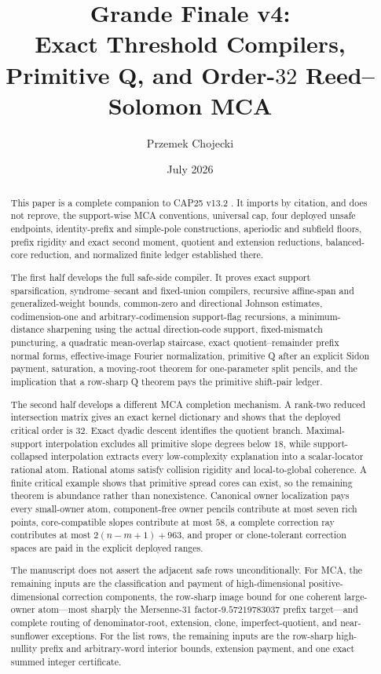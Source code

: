 \documentclass[11pt,a4paper]{amsart}
\title[Grande Finale v4]{Grande Finale v4:\\
Exact Threshold Compilers, Primitive Q, and Order-$32$ Reed--Solomon MCA}
\author{Przemek Chojecki}
\date{July 2026}
\numberwithin{equation}{section}
\theoremstyle{remark}
\begin{document}
\begin{abstract}
This paper is a complete companion to CAP25 v13.2 \cite{CAP25v132}.  It imports by citation, and does not reprove, the support-wise MCA conventions, universal cap, four deployed unsafe endpoints, identity-prefix and simple-pole constructions, aperiodic and subfield floors, prefix rigidity and exact second moment, quotient and extension reductions, balanced-core reduction, and normalized finite ledger established there.

The first half develops the full safe-side compiler.  It proves exact support sparsification, syndrome--secant and fixed-union compilers, recursive affine-span and generalized-weight bounds, common-zero and directional Johnson estimates, codimension-one and arbitrary-codimension support-flag recursions, a minimum-distance sharpening using the actual direction-code support, fixed-mismatch puncturing, a quadratic mean-overlap staircase, exact quotient--remainder prefix normal forms, effective-image Fourier normalization, primitive Q after an explicit Sidon payment, saturation, a moving-root theorem for one-parameter split pencils, and the implication that a row-sharp Q theorem pays the primitive shift-pair ledger.

The second half develops a different MCA completion mechanism.  A rank-two reduced intersection matrix gives an exact kernel dictionary and shows that the deployed critical order is $32$.  Exact dyadic descent identifies the quotient branch.  Maximal-support interpolation excludes all primitive slope degrees below $18$, while support-collapsed interpolation extracts every low-complexity explanation into a scalar-locator rational atom.  Rational atoms satisfy collision rigidity and local-to-global coherence.  A finite critical example shows that primitive spread cores can exist, so the remaining theorem is abundance rather than nonexistence.  Canonical owner localization pays every small-owner atom, component-free owner pencils contribute at most seven rich points, core-compatible slopes contribute at most $58$, a complete correction ray contributes at most $2(n-m+1)+963$, and proper or clone-tolerant correction spaces are paid in the explicit deployed ranges.

The manuscript does not assert the adjacent safe rows unconditionally.  For MCA, the remaining inputs are the classification and payment of high-dimensional positive-dimensional correction components, the row-sharp image bound for one coherent large-owner atom---most sharply the Mersenne-31 factor-$9.57219783037$ prefix target---and complete routing of denominator-root, extension, clone, imperfect-quotient, and near-sunflower exceptions.  For the list rows, the remaining inputs are the row-sharp high-nullity prefix and arbitrary-word interior bounds, extension payment, and one exact summed integer certificate.
\end{abstract}
\maketitle
\tableofcontents
\end{document}
